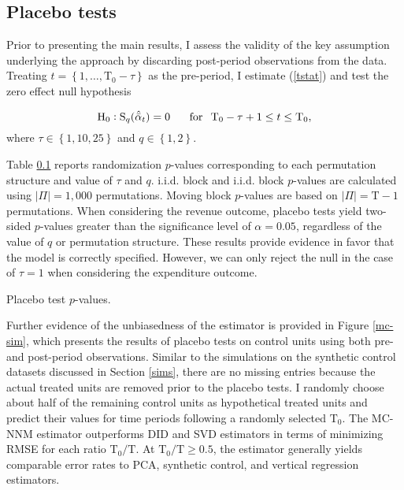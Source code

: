 \subsection{Placebo tests} \label{placebo-tests}

Prior to presenting the main results, I assess the validity of the key assumption underlying the approach by discarding post-period observations from the data. Treating $t = \left\{1, \ldots,  \text{T}_0 - \tau\right\}$ as the pre-period, I estimate (\ref{tstat}) and test the zero effect null hypothesis 

\begin{equation} \label{h0-placebo}
\text{H}_0: \text{S}_q (\hat{\bar{\alpha}}_{t}) = 0  \, \hspace{5mm} \,  \text{for} \, \hspace{2mm}  \text{T}_0 - \tau +1 \leq t \leq  \text{T}_0,
\end{equation}
\noindent
where $\tau \in \left\{1, 10, 25\right\}$ and $q \in \left\{1, 2\right\}$. 

Table \ref{placebo-tests} reports randomization $p$-values corresponding to each permutation structure and value of $\tau$ and $q$. i.i.d. block and i.i.d. block $p$-values are calculated using $|\Pi| = 1,000$ permutations. Moving block $p$-values are based on $|\Pi| = \text{T}-1$ permutations. When considering the revenue outcome, placebo tests yield two-sided $p$-values greater than the significance level of $\alpha = 0.05$, regardless of the value of $q$ or permutation structure. These results provide evidence in favor that the model is correctly specified. However, we can only reject the null in the case of $\tau=1$ when considering the expenditure outcome. 

\begin{table}[htbp]
	\captionsetup{font=normalsize}
	\caption{Placebo test $p$-values.\label{placebo-tests}}
	\begin{center}
		\scalebox{.95}{}
	\end{center}
\end{table}

Further evidence of the unbiasedness of the estimator is provided in Figure \ref{mc-sim}, which presents the results of placebo tests on control units using both pre- and post-period observations. Similar to the simulations on the synthetic control datasets discussed in Section \ref{sims}, there are no missing entries because the actual treated units are removed prior to the placebo tests. I randomly choose about half of the remaining control units as hypothetical treated units and predict their values for time periods following a randomly selected $\text{T}_0$. The MC-NNM estimator outperforms DID and SVD estimators in terms of minimizing RMSE for each ratio $\text{T}_0/\text{T}$. At $\text{T}_0/\text{T} \geq 0.5$, the estimator generally yields comparable error rates to PCA, synthetic control, and vertical regression estimators. 

